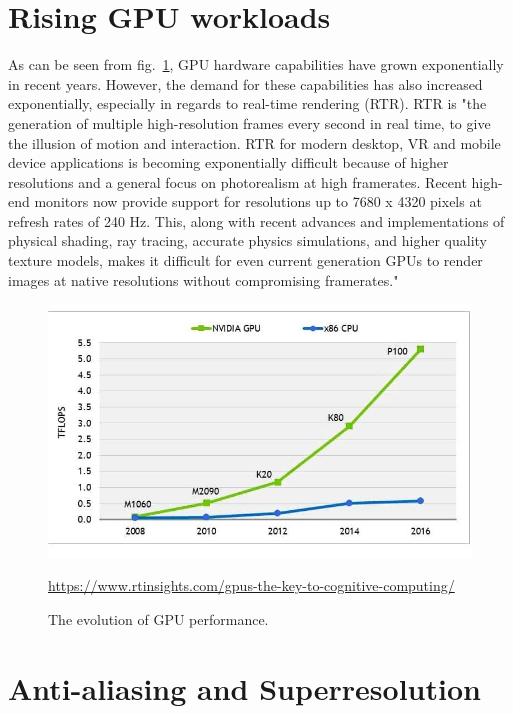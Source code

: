 \documentclass[10pt,oneside,english,a4paper]{article}
\begin{document}
\section{Rising GPU workloads} \label{rise}

As can be seen from fig.~\ref{f:graph}, GPU hardware capabilities have grown exponentially in recent years. However, the demand for these capabilities has also increased exponentially, especially in regards to real-time rendering (RTR). RTR is "the generation of multiple high-resolution frames every second in real time, to give the illusion of motion and interaction. RTR for modern desktop, VR and mobile device applications is becoming exponentially difficult because of higher resolutions and a general focus on photorealism at high framerates. Recent high-end monitors now provide support for resolutions up to 7680 x 4320 pixels at refresh rates of 240 Hz. This, along with recent advances and implementations of physical shading, ray tracing, accurate physics simulations, and higher quality texture models, makes it difficult for even current generation GPUs to render images at native resolutions without compromising framerates."\cite{9441822}

\begin{figure}[tbh]
\centering
\includegraphics[scale=0.4]{gpugraph.jpg}
\caption{The evolution of GPU performance.}
\url{https://www.rtinsights.com/gpus-the-key-to-cognitive-computing/}
\label{f:graph}
\end{figure}



\section{Anti-aliasing and Superresolution} \label{aasr}
\end{document}
